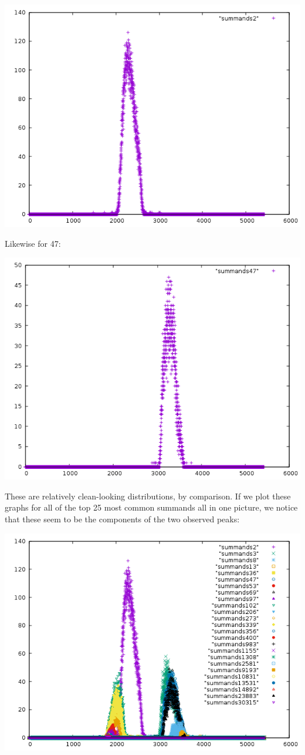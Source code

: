 \documentclass{article}
\theoremstyle{definition}
\theoremstyle{remark}
\numberwithin{equation}{section}
\begin{document}
{\includegraphics[scale=0.5]{../figs/summands2.png}

Likewise for 47:

\includegraphics[scale=0.5]{../figs/summands47.png}

These are relatively clean-looking distributions, by comparison.  If
we plot these graphs for all of the top 25 most common summands all in
one picture, we notice that these seem to be the components of the two
observed peaks:

\includegraphics[scale=0.5]{../figs/summands_mod_5422.png}

}
\end{document}
